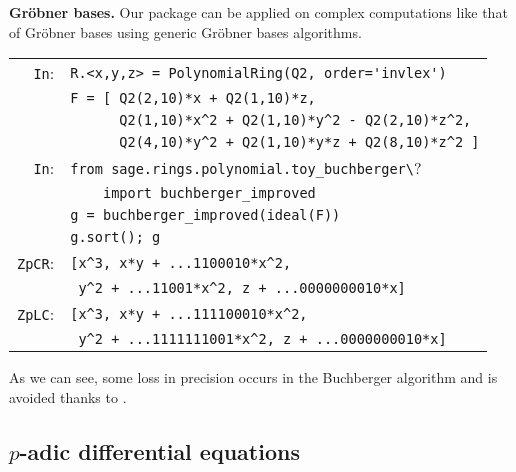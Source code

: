 \documentclass[sigconf]{acmart}
\newcommand{\ZpFP}{\text{\color{output} \rm \tt ZpFP}\xspace}
\newcommand{\ZpL}{\text{\color{output} \rm \tt ZpL}\xspace}
\newcommand{\cIn}{{\color{input} \tt \phantom{Zp}In}:}
\newcommand{\cZpCR}{{\color{output} \tt ZpCR}:}
\newcommand{\cZpLC}{{\color{output} \tt ZpLC}:}
\theoremstyle{definition}
\begin{document}
\medskip

\noindent \textbf{Gröbner bases.}
%
Our package can be applied on complex computations like that of Gröbner 
bases using generic Gröbner bases algorithms.

\smallskip

{\noindent \small
\begin{tabular}{@{}rl}
\cIn
 & \verb?R.<x,y,z> = ?{\color{constructor}\verb?PolynomialRing?}\verb?(?{\color{ring}\verb?Q2?}\verb?, order=?{\color{string}\verb?'invlex'?}\verb?)? \\
 & \verb?F = [ ?{\color{ring}\verb?Q2?}\verb?(2,10)*x + ?{\color{ring}\verb?Q2?}\verb?(1,10)*z, ? \\
 & \verb?      ?{\color{ring}\verb?Q2?}\verb?(1,10)*x^2 + ?{\color{ring}\verb?Q2?}\verb?(1,10)*y^2 - ?{\color{ring}\verb?Q2?}\verb?(2,10)*z^2,? \\
 & \verb?      ?{\color{ring}\verb?Q2?}\verb?(4,10)*y^2 + ?{\color{ring}\verb?Q2?}\verb?(1,10)*y*z + ?{\color{ring}\verb?Q2?}\verb?(8,10)*z^2 ]? \\
\cIn
 & {\color{keyword}\verb?from?}\verb? sage.rings.polynomial.toy_buchberger\?\\
 & \verb?    ?{\color{keyword}\verb?import?}\verb? ?{\color{function}\verb?buchberger_improved?} \\
 & \verb?g = ?{\color{function}\verb?buchberger_improved?}\verb?(ideal(F))? \\
 & \verb?g.?{\color{method}\verb?sort?}\verb?(); g? \\
\cZpCR
 & \verb?[x^3, x*y + ...1100010*x^2,? \\
 & \verb? y^2 + ...11001*x^2, z + ...0000000010*x]? \\
\cZpLC
 & \verb?[x^3, x*y + ...111100010*x^2,? \\
 & \verb? y^2 + ...1111111001*x^2, z + ...0000000010*x]? \\
\end{tabular}}

\smallskip

\noindent
As we can see, some loss in precision occurs in the
Buchberger algorithm and is avoided thanks to \ZpL.

\subsection{$p$-adic differential equations}
\end{document}
